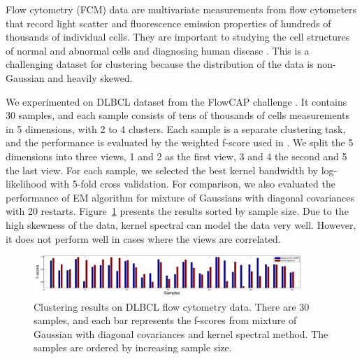 
Flow cytometry (FCM) data are multivariate measurements from flow cytometers that record light scatter and fluorescence emission properties of hundreds of thousands of individual cells. They are important to studying the cell structures of normal and abnormal cells and diagnosing human disease \cite{cytometry_nature}. This is a challenging dataset for clustering because the distribution of the data is non-Gaussian and heavily skewed.

We experimented on DLBCL dataset from the FlowCAP challenge \cite{cytometry_nature}. It contains 30 samples, and each sample consists of tens of thousands of cells measurements in 5 dimensions, with 2 to 4 clusters. Each sample is a separate clustering task, and the performance is evaluated by the weighted f-score used in \cite{cytometry_nature}. We split the 5 dimensions into three views, 1 and 2 as the first view, 3 and 4 the second and 5 the last view. For each sample, we selected the best kernel bandwidth by log-likelihood with 5-fold cross validation. For comparison, we also evaluated the performance of EM algorithm for mixture of Gaussians with diagonal covariances with 20 restarts. Figure~\ref{fig:real_data} presents the results sorted by sample size. Due to the high skewness of the data, kernel spectral can model the data very well. However, it does not perform well in cases where the views are correlated. 


\begin{figure}
  \centering
  \includegraphics[width=0.9\textwidth]{../experiment/figure/paired_bar_chat} 
   \vspace{-3mm}
  \caption{Clustering results on DLBCL flow cytometry data. There are 30 samples, and each bar represents the f-scores from mixture of Gaussian with diagonal covariances and kernel spectral method. The samples are ordered by increasing sample size.}\label{fig:real_data}
  \vspace{-3mm}
\end{figure}
